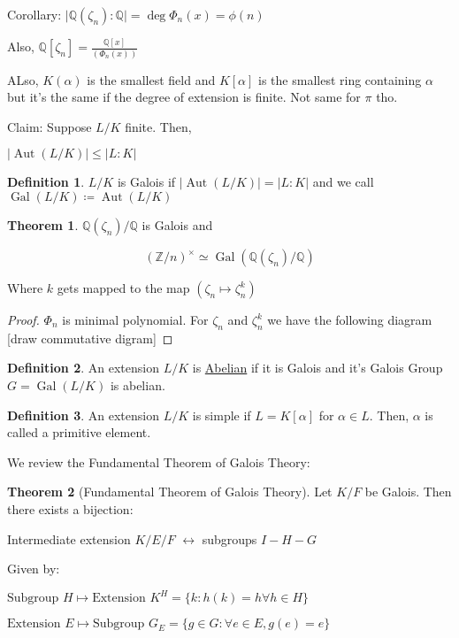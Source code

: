 \documentclass{article}
\theoremstyle{definition}
\newtheorem{definition}{Definition}
\newtheorem{theorem}{Theorem}
\begin{document}
Corollary: \(\vert \mathbb{Q} (\zeta _n) : \mathbb{Q} \vert = \deg \Phi_n(x)=\phi(n) \) 

Also, \(\mathbb{Q} [\zeta_n]=\frac{\mathbb{Q}[x]}{(\Phi_n(x))}\) 

ALso, \(K(\alpha)\) is the smallest field and \(K[\alpha]\) is the smallest ring containing \(\alpha \) but it's the same if the degree of extension is finite. Not same for \(\pi\) tho.

Claim: Suppose \(L/K\) finite. Then,

\(\vert \operatorname{Aut}(L / K) \vert \leq \vert L:K \vert  \) 

\begin{definition}
    \(L/K\) is Galois if \(\vert \operatorname{Aut}(L / K) \vert = \vert L:K  \vert \) and we call \(\operatorname{Gal}(L / K)\coloneqq \operatorname{Aut}(L / K)  \) 
\end{definition}

\begin{theorem}
    \(\mathbb{Q}(\zeta_n)/\mathbb{Q}\) is Galois and

    \[
        (\mathbb{Z} / n)^\times \simeq \operatorname{Gal}(\mathbb{Q} (\zeta_n) / \mathbb{Q}) 
    \]

    Where \(k\) gets mapped to the map \((\zeta_n \mapsto \zeta_n^k)\) 

\end{theorem}

\begin{proof}
    \(\Phi_n\) is minimal polynomial. For \(\zeta _n\) and \(\zeta _n^k\) we have the following diagram [draw commutative digram] 
\end{proof}

\begin{definition}
    An extension \(L / K\)  is \underline{Abelian} if it is Galois and it's Galois Group \(G = \operatorname{Gal}(L / K) \) is abelian.
\end{definition}

\begin{definition}
    An extension \(L / K\) is simple if \(L=K[\alpha]\) for \(\alpha \in L\). Then, \(\alpha \) is called a primitive element. 
\end{definition}

We review the Fundamental Theorem of Galois Theory:

\begin{theorem}[Fundamental Theorem of Galois Theory]
    Let \(K / F\) be Galois. Then there exists a bijection:

    Intermediate extension \(K / E / F\) \(\leftrightarrow\) subgroups \(I - H - G\)  

    Given by:

    \(\text{Subgroup } H \mapsto \text{Extension }  K^H = \{ k : h(k) = h \forall h\in H \} \) 

    \(\text{Extension } E \mapsto \text{Subgroup } G_E = \{ g\in G : \forall e\in E, g(e)=e \}  \) 

\end{theorem}
\end{document}
